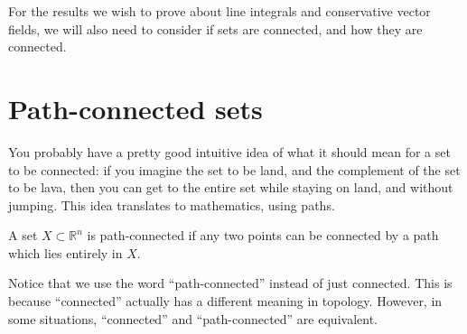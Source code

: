 \documentclass{ximera}
\begin{document}
For the results we wish to prove about line integrals and conservative vector fields, we will also need to consider if sets are connected, and how they are connected.

\section*{Path-connected sets}

You probably have a pretty good intuitive idea of what it should mean for a set to be connected: if you imagine the set to be land, and the complement of the set to be lava, then you can get to the entire set while staying on land, and without jumping. This idea translates to mathematics, using paths.

\begin{definition}
A set $X\subset \mathbb{R}^n$ is path-connected if any two points can be connected by a path which lies entirely in $X$.
\end{definition}

Notice that we use the word ``path-connected'' instead of just connected. This is because ``connected'' actually has a different meaning in topology. However, in some situations, ``connected'' and ``path-connected'' are equivalent.
\end{document}
